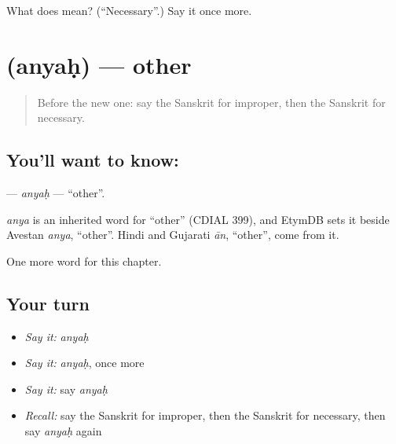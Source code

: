 \begin{tcolorbox}[breakable,colback=teal!4,colframe=teal!35!black,title={Before you move on}]
What does  mean? (\textquotedblleft{}Necessary\textquotedblright{}.) Say it once more.
\end{tcolorbox}
\section[\texorpdfstring{\sk{अन्यः} (anyaḥ)}{अन्यः (anyaḥ)}]{ (anyaḥ) — other}

\label{lesson:SA-C244-anyah}



\begin{quote}
Before the new one: say the Sanskrit for improper, then the Sanskrit for necessary.
\end{quote}

\subsection*{You'll want to know: }
\textbf{} — \emph{anyaḥ} — \textquotedblleft{}other\textquotedblright{}.

\begin{cousinweb}
\emph{anya} is an inherited word for \textquotedblleft{}other\textquotedblright{} (CDIAL 399), and EtymDB sets it beside Avestan \emph{anya}, \textquotedblleft{}other\textquotedblright{}. Hindi and Gujarati \emph{ān}, \textquotedblleft{}other\textquotedblright{}, come from it.
\end{cousinweb}

\begin{grammarlens}[title={What you've built}]
One more word for this chapter.
\end{grammarlens}

\subsection*{Your turn}
\begin{itemize}
\raggedright
  \item \emph{Say it:} \emph{anyaḥ}
  \item \emph{Say it:} \emph{anyaḥ}, once more
  \item \emph{Say it:} say \emph{anyaḥ}
  \item \emph{Recall:} say the Sanskrit for improper, then the Sanskrit for necessary, then say \emph{anyaḥ} again
\end{itemize}

